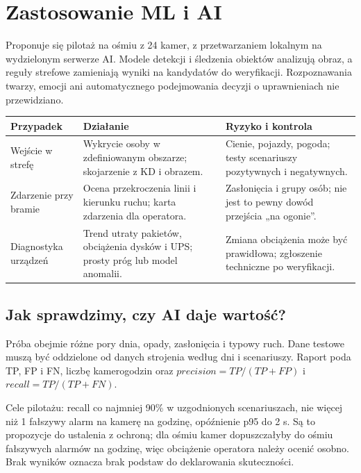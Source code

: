 \section{Zastosowanie ML i AI}
Proponuje się pilotaż na ośmiu z 24 kamer, z przetwarzaniem lokalnym na wydzielonym serwerze AI. Modele detekcji i śledzenia obiektów analizują obraz, a reguły strefowe zamieniają wyniki na kandydatów do weryfikacji. Rozpoznawania twarzy, emocji ani automatycznego podejmowania decyzji o uprawnieniach nie przewidziano.

\begin{tabularx}{\linewidth}{@{}P{32mm}Y Y@{}}
\toprule\textbf{Przypadek} & \textbf{Działanie} & \textbf{Ryzyko i kontrola}\\\midrule
Wejście w strefę & Wykrycie osoby w zdefiniowanym obszarze; skojarzenie z KD i obrazem. & Cienie, pojazdy, pogoda; testy scenariuszy pozytywnych i negatywnych.\\
Zdarzenie przy bramie & Ocena przekroczenia linii i kierunku ruchu; karta zdarzenia dla operatora. & Zasłonięcia i grupy osób; nie jest to pewny dowód przejścia „na ogonie”.\\
Diagnostyka urządzeń & Trend utraty pakietów, obciążenia dysków i UPS; prosty próg lub model anomalii. & Zmiana obciążenia może być prawidłowa; zgłoszenie techniczne po weryfikacji.\\\bottomrule
\end{tabularx}

\subsection*{Jak sprawdzimy, czy AI daje wartość?}
Próba obejmie różne pory dnia, opady, zasłonięcia i typowy ruch. Dane testowe muszą być oddzielone od danych strojenia według dni i scenariuszy. Raport poda TP, FP i FN, liczbę kamerogodzin oraz \(precision=TP/(TP+FP)\) i \(recall=TP/(TP+FN)\).

Cele pilotażu: recall co najmniej 90\% w uzgodnionych scenariuszach, nie więcej niż 1 fałszywy alarm na kamerę na godzinę, opóźnienie p95 do 2 s. Są to propozycje do ustalenia z ochroną; dla ośmiu kamer dopuszczałyby do ośmiu fałszywych alarmów na godzinę, więc obciążenie operatora należy ocenić osobno. Brak wyników oznacza brak podstaw do deklarowania skuteczności.
